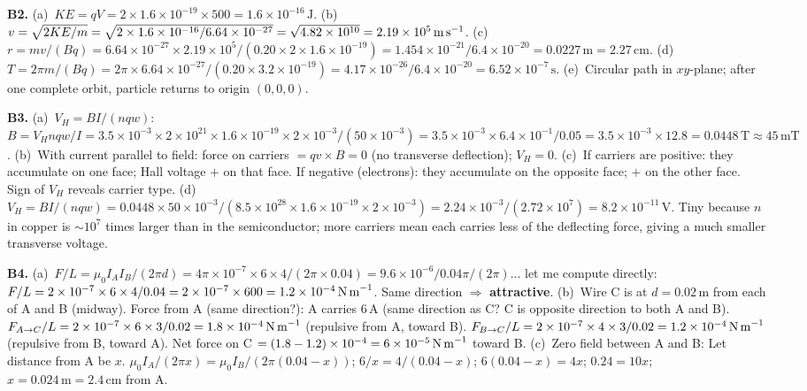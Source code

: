 \textbf{B2.}
(a)~$KE=qV=2\times1.6\times10^{-19}\times500
=1.6\times10^{-16}\,\text{J}$. \quad
(b)~$v=\sqrt{2KE/m}=\sqrt{2\times1.6\times10^{-16}/
6.64\times10^{-27}}=\sqrt{4.82\times10^{10}}
=2.19\times10^5\,\text{m\,s}^{-1}$. \quad
(c)~$r=mv/(Bq)=6.64\times10^{-27}
\times2.19\times10^5/(0.20\times2\times1.6\times10^{-19})
=1.454\times10^{-21}/6.4\times10^{-20}
=0.0227\,\text{m}=2.27\,\text{cm}$. \quad
(d)~$T=2\pi m/(Bq)=2\pi\times6.64\times10^{-27}/
(0.20\times3.2\times10^{-19})=4.17\times10^{-26}/
6.4\times10^{-20}=6.52\times10^{-7}\,\text{s}$. \quad
(e)~Circular path in $xy$-plane; after one complete
orbit, particle returns to origin $(0,0,0)$.

\textbf{B3.}
(a)~$V_H=BI/(nqw)$:
$B=V_H nqw/I=3.5\times10^{-3}\times2\times10^{21}
\times1.6\times10^{-19}\times2\times10^{-3}/
(50\times10^{-3})
=3.5\times10^{-3}\times6.4\times10^{-1}/0.05
=3.5\times10^{-3}\times12.8=0.0448\,\text{T}
\approx45\,\text{mT}$. \quad
(b)~With current parallel to field: force on carriers
$=qv\times B=0$ (no transverse deflection);
$V_H=0$. \quad
(c)~If carriers are positive: they accumulate on one
face; Hall voltage $+$ on that face. If negative
(electrons): they accumulate on the opposite face;
$+$ on the other face. Sign of $V_H$ reveals carrier
type. \quad
(d)~$V_H=BI/(nqw)=0.0448\times50\times10^{-3}/
(8.5\times10^{28}\times1.6\times10^{-19}
\times2\times10^{-3})
=2.24\times10^{-3}/(2.72\times10^7)
=8.2\times10^{-11}\,\text{V}$. Tiny because $n$ in
copper is $\sim10^7$ times larger than in the
semiconductor; more carriers mean each carries less
of the deflecting force, giving a much smaller
transverse voltage.

\textbf{B4.}
(a)~$F/L=\mu_0I_AI_B/(2\pi d)
=4\pi\times10^{-7}\times6\times4/(2\pi\times0.04)
=9.6\times10^{-6}/0.04\pi/(2\pi)$... let me compute directly:
$F/L=2\times10^{-7}\times6\times4/0.04
=2\times10^{-7}\times600=1.2\times10^{-4}\,\text{N\,m}^{-1}$.
Same direction $\Rightarrow$ \textbf{attractive}. \quad
(b)~Wire C is at $d=0.02\,\text{m}$ from each of A
and B (midway). Force from A (same direction?):
A carries $6\,\text{A}$ (same direction as C? C is
opposite direction to both A and B).
$F_{A\to C}/L=2\times10^{-7}\times6\times3/0.02
=1.8\times10^{-4}\,\text{N\,m}^{-1}$ (repulsive
from A, toward B).
$F_{B\to C}/L=2\times10^{-7}\times4\times3/0.02
=1.2\times10^{-4}\,\text{N\,m}^{-1}$ (repulsive
from B, toward A).
Net force on C $=(1.8-1.2)\times10^{-4}
=6\times10^{-5}\,\text{N\,m}^{-1}$ toward B. \quad
(c)~Zero field between A and B: Let distance from
A be $x$.
$\mu_0I_A/(2\pi x)=\mu_0I_B/(2\pi(0.04-x))$;
$6/x=4/(0.04-x)$; $6(0.04-x)=4x$;
$0.24=10x$; $x=0.024\,\text{m}=2.4\,\text{cm}$ from A.

